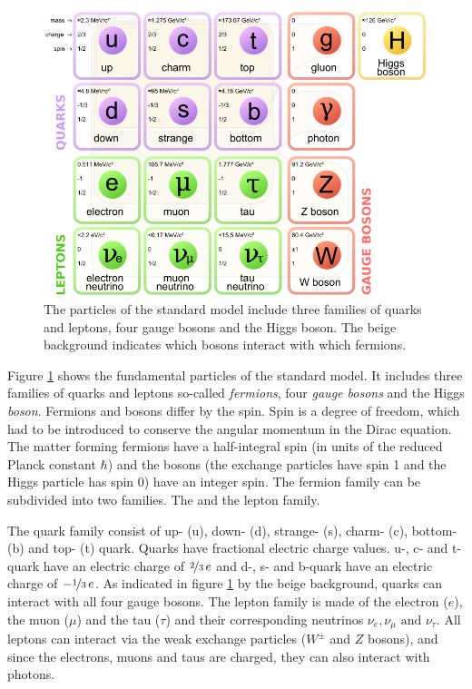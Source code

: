 \documentclass[a4paper,11pt,twosided,final,german,openbib,pdftex,listof=totoc,bibliography=totoc]{scrbook}
\begin{document}
\begin{figure}[h!]
	\centering
	\includegraphics[width=\textwidth]{Bilder/SM.png}
	\caption[Standard Model]{The particles of the standard model include three families of quarks and leptons, four gauge bosons and the Higgs boson. The beige background indicates which bosons interact with which fermions. \cite{SMFigure}}
	\label{fig:SM}
\end{figure}



Figure \ref{fig:SM} shows the fundamental particles of the standard model. It includes three families of quarks and leptons so-called \textit{fermions}, four \textit{gauge bosons} and the Higgs \textit{boson}. Fermions and bosons differ by the spin. Spin is a degree of freedom, which had to be introduced to conserve the angular momentum in the Dirac equation. The matter forming fermions have a half-integral spin (in units of the reduced Planck constant $\hbar$) and the bosons (the exchange particles have spin 1 and the Higgs particle has spin 0) have an integer spin. The fermion family can be subdivided into two families. The  and the lepton family. 

The quark family consist of up- (u), down- (d), strange- (s), charm- (c), bottom- (b) and top- (t) quark. Quarks have fractional electric charge values. u-, c- and t-quark have an electric charge of $\nicefrac{2}{3} \,e$ and d-, s- and b-quark have an electric charge of $-\nicefrac{1}{3} \,e$. As indicated in figure \ref{fig:SM} by the beige background, quarks can interact with all four gauge bosons.
The lepton family is made of the electron ($e$), the muon ($\mu$) and the tau ($\tau$) and their corresponding neutrinos $\nu_e,\nu_{\mu} \textrm{ and } \nu_{\tau}$. All leptons can interact via the weak exchange particles ($W^{\pm}$ and $Z$ bosons), and since the electrons, muons and taus are charged, they can also interact with photons.
\end{document}
